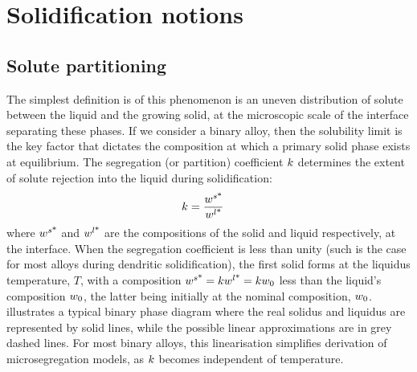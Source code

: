 \section{Solidification notions}
%
\subsection{Solute partitioning}
The simplest definition is of this phenomenon is an uneven distribution of solute between the liquid and the growing solid, at the microscopic scale
of the interface separating these phases. If we consider a binary alloy, then the solubility limit is 
the key factor that dictates the composition at which a primary solid phase exists at equilibrium. 
The segregation (or partition) coefficient $k$ determines the extent of solute rejection into the liquid during solidification:
\begin{align}
\label{eq:partition}
& k = \frac{{w}^{s \text{*}} }{{w}^{l \text{*}} }
\end{align}
where ${w}^{s \text{*}} $ and ${w}^{l \text{*}} $ are the compositions of the solid and liquid respectively, at the interface. When the 
segregation coefficient is less than unity (such is the case for most alloys during dendritic solidification), 
the first solid forms at the liquidus temperature, $T$, with a composition ${w}^{s \text{*}} =k {w}^{l \text{*}} =k {w}_0$ less than the liquid's 
composition ${w}_0$, the latter being initially at the nominal composition, ${w}_0$.  illustrates a typical binary 
phase diagram where the real solidus and liquidus are represented by solid lines, while the possible linear approximations are in grey dashed lines.
For most binary alloys, this linearisation simplifies derivation of microsegregation models, as $k$ becomes independent of temperature.


